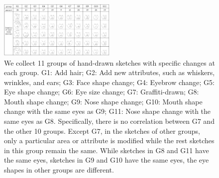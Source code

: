 \documentclass{article}
\begin{document}
\begin{figure}[htbp]
	\centering
	\includegraphics[width=0.5\textwidth]{hand_drawn_sketches.png}
	\caption{We collect 11 groups of hand-drawn sketches with specific changes at each group. G1: Add hair; G2: Add new attributes, such as whiskers, wrinkles, and ears; G3: Face shape change; G4: Eyebrow change; G5: Eye shape change; G6: Eye size change; G7: Graffiti-drawn; G8: Mouth shape change; G9: Nose shape change; G10: Mouth shape change with the same eyes as G9; G11: Nose shape change with the same eyes as G8. Specifically, there is no correlation between G7 and the other 10 groups. Except G7, in the sketches of other groups, only a particular area or attribute is modified while the rest sketches in this group remain the same. While sketches in G8 and G11 have the same eyes, sketches in G9 and G10 have the same eyes, the eye shapes in other groups are different.}
	\label{fig:hand_drawn_contours}
\end{figure}
\end{document}
